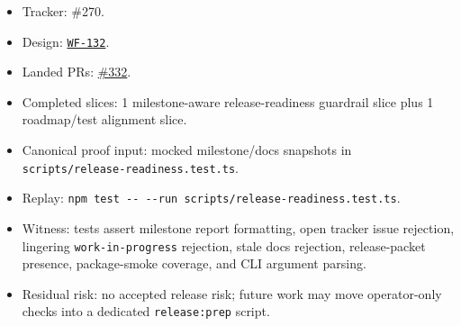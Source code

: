 \begin{itemize}
\tightlist
\item
  Tracker: \#270.
\item
  Design: \href{https://github.com/flyingrobots/bijou/blob/cbd70612140e7a450d764b3c7be1c6af878b99bc/docs/design/WF-132-release-readiness-and-dogfood-i18n-gates.md}{\texttt{W\allowbreak{}F\allowbreak{}-\allowbreak{}1\allowbreak{}3\allowbreak{}2}}.
\item
  Landed PRs: \href{https://github.com/flyingrobots/bijou/pull/332}{\#332}.
\item
  Completed slices: 1 milestone-aware release-readiness guardrail slice plus 1 roadmap/test alignment slice.
\item
  Canonical proof input: mocked milestone/docs snapshots in \texttt{s\allowbreak{}c\allowbreak{}r\allowbreak{}i\allowbreak{}p\allowbreak{}t\allowbreak{}s\allowbreak{}/\allowbreak{}r\allowbreak{}e\allowbreak{}l\allowbreak{}e\allowbreak{}a\allowbreak{}s\allowbreak{}e\allowbreak{}-\allowbreak{}r\allowbreak{}e\allowbreak{}a\allowbreak{}d\allowbreak{}i\allowbreak{}n\allowbreak{}e\allowbreak{}s\allowbreak{}s\allowbreak{}.\allowbreak{}t\allowbreak{}e\allowbreak{}s\allowbreak{}t\allowbreak{}.\allowbreak{}t\allowbreak{}s}.
\item
  Replay: \texttt{n\allowbreak{}p\allowbreak{}m\allowbreak{} \allowbreak{}t\allowbreak{}e\allowbreak{}s\allowbreak{}t\allowbreak{} \allowbreak{}-\allowbreak{}-\allowbreak{} \allowbreak{}-\allowbreak{}-\allowbreak{}r\allowbreak{}u\allowbreak{}n\allowbreak{} \allowbreak{}s\allowbreak{}c\allowbreak{}r\allowbreak{}i\allowbreak{}p\allowbreak{}t\allowbreak{}s\allowbreak{}/\allowbreak{}r\allowbreak{}e\allowbreak{}l\allowbreak{}e\allowbreak{}a\allowbreak{}s\allowbreak{}e\allowbreak{}-\allowbreak{}r\allowbreak{}e\allowbreak{}a\allowbreak{}d\allowbreak{}i\allowbreak{}n\allowbreak{}e\allowbreak{}s\allowbreak{}s\allowbreak{}.\allowbreak{}t\allowbreak{}e\allowbreak{}s\allowbreak{}t\allowbreak{}.\allowbreak{}t\allowbreak{}s}.
\item
  Witness: tests assert milestone report formatting, open tracker issue rejection, lingering \texttt{w\allowbreak{}o\allowbreak{}r\allowbreak{}k\allowbreak{}-\allowbreak{}i\allowbreak{}n\allowbreak{}-\allowbreak{}p\allowbreak{}r\allowbreak{}o\allowbreak{}g\allowbreak{}r\allowbreak{}e\allowbreak{}s\allowbreak{}s} rejection, stale docs rejection, release-packet presence, package-smoke coverage, and CLI argument parsing.
\item
  Residual risk: no accepted release risk; future work may move operator-only checks into a dedicated \texttt{r\allowbreak{}e\allowbreak{}l\allowbreak{}e\allowbreak{}a\allowbreak{}s\allowbreak{}e\allowbreak{}:\allowbreak{}p\allowbreak{}r\allowbreak{}e\allowbreak{}p} script.
\end{itemize}

